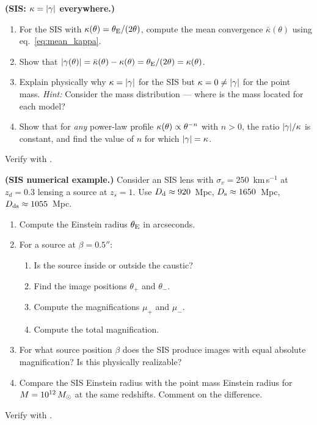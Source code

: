 \begin{exercise}
\label{ex:sis_kappa_equals_gamma}
\textbf{(SIS: $\kappa = |\gamma|$ everywhere.)}
\begin{enumerate}[label=(\alph*)]
    \item For the SIS with $\kappa(\theta) = \theta_{\mathrm{E}}/(2\theta)$,
          compute the mean convergence $\bar{\kappa}(\theta)$ using
          eq.~\eqref{eq:mean_kappa}.
    \item Show that $|\gamma(\theta)| = \bar{\kappa}(\theta) -
          \kappa(\theta) = \theta_{\mathrm{E}}/(2\theta) = \kappa(\theta)$.
    \item Explain physically why $\kappa = |\gamma|$ for the SIS
          but $\kappa = 0 \neq |\gamma|$ for the point mass.
          \textit{Hint:} Consider the mass distribution --- where is
          the mass located for each model?
    \item Show that for \textit{any} power-law profile
          $\kappa(\theta) \propto \theta^{-n}$ with $n > 0$, the
          ratio $|\gamma|/\kappa$ is constant, and find the value of
          $n$ for which $|\gamma| = \kappa$.
\end{enumerate}
Verify with
.
\end{exercise}

\begin{exercise}
\label{ex:sis_numerical}
\textbf{(SIS numerical example.)}
Consider an SIS lens with $\sigma_v = 250$~km\,s$^{-1}$ at
$z_d = 0.3$ lensing a source at $z_s = 1$.  Use
$D_{\mathrm{d}} \approx 920$~Mpc, $D_{\mathrm{s}} \approx 1650$~Mpc,
$D_{\mathrm{ds}} \approx 1055$~Mpc.
\begin{enumerate}[label=(\alph*)]
    \item Compute the Einstein radius $\theta_{\mathrm{E}}$ in arcseconds.
    \item For a source at $\beta = 0.5''$:
          \begin{enumerate}[label=(\roman*)]
              \item Is the source inside or outside the caustic?
              \item Find the image positions $\theta_+$ and $\theta_-$.
              \item Compute the magnifications $\mu_+$ and $\mu_-$.
              \item Compute the total magnification.
          \end{enumerate}
    \item For what source position $\beta$ does the SIS produce images
          with equal absolute magnification?  Is this physically
          realizable?
    \item Compare the SIS Einstein radius with the point mass Einstein
          radius for $M = 10^{12}\,M_{\odot}$ at the same redshifts.
          Comment on the difference.
\end{enumerate}
Verify with
.
\end{exercise}

